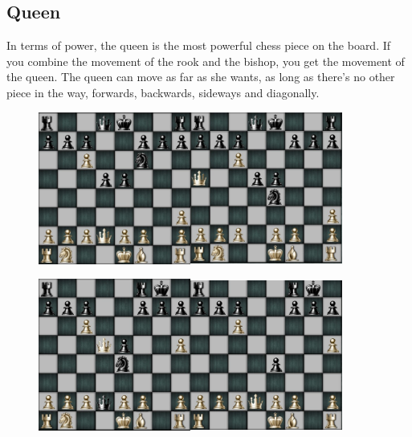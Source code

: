 \documentclass{article}
\begin{document}
\subsection*{Queen} In terms of power, the queen is the most powerful chess piece on the board. If you combine the movement of the rook and the bishop, you get the movement of the queen. The queen can move as far as she wants, as long as there’s no other piece in the way, forwards, backwards, sideways and diagonally.
\begin{figure}[!]
\includegraphics[width=5cm, height=5cm]{queen1}\includegraphics[width=5cm, height=5cm]{queen2}
\end{figure}

\begin{figure}[!]
\includegraphics[width=5cm, height=5cm]{queen3}\includegraphics[width=5cm, height=5cm]{queen4}
\end{figure}
\end{document}
